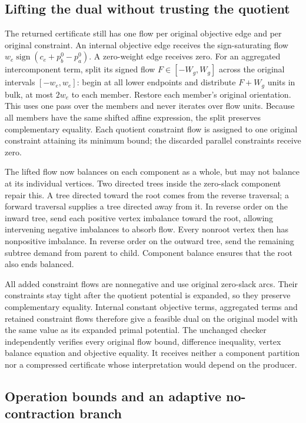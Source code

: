 \subsection{Lifting the dual without trusting the quotient}

The returned certificate still has one flow per original objective edge and
per original constraint. An internal objective edge receives the sign-saturating
flow $w_e\operatorname{sign}(c_e+p^0_b-p^0_a)$. A zero-weight edge receives zero.
For an aggregated intercomponent term, split its signed flow $F\in[-W_g,W_g]$
across the original intervals $[-w_e,w_e]$: begin at all lower endpoints and
distribute $F+W_g$ units in bulk, at most $2w_e$ to each member. Restore each
member's original orientation. This uses one pass over the members and never
iterates over flow units. Because all members have the same shifted affine
expression, the split preserves complementary equality. Each quotient
constraint flow is assigned to one original constraint attaining its minimum
bound; the discarded parallel constraints receive zero.

The lifted flow now balances on each component as a whole, but may not balance
at its individual vertices. Two directed trees inside the zero-slack component
repair this. A tree directed toward the root comes from the reverse traversal;
a forward traversal supplies a tree directed away from it. In reverse order
on the inward tree, send each positive vertex imbalance toward the root,
allowing intervening negative imbalances to absorb flow. Every nonroot vertex
then has nonpositive imbalance. In reverse order on the outward tree, send
the remaining subtree demand from parent to child. Component balance ensures
that the root also ends balanced.

All added constraint flows are nonnegative and use original zero-slack arcs.
Their constraints stay tight after the quotient potential is expanded, so
they preserve complementary equality. Internal constant objective terms,
aggregated terms and retained constraint flows therefore give a feasible dual
on the original model with the same value as its expanded primal potential.
The unchanged checker independently verifies every original flow bound,
difference inequality, vertex balance equation and objective equality. It
receives neither a component partition nor a compressed certificate whose
interpretation would depend on the producer.

\subsection{Operation bounds and an adaptive no-contraction branch}


